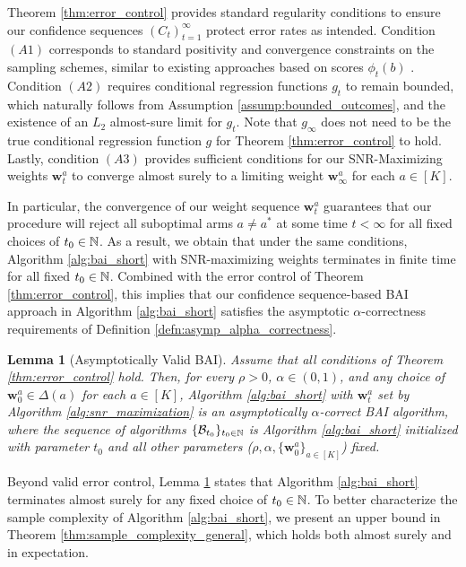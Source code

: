 \documentclass{article}
\newtheorem{lemma}{Lemma}
\begin{document}
Theorem \ref{thm:error_control} provides standard regularity conditions to ensure our confidence sequences $(C_t)_{t=1}^\infty$ protect error rates as intended. Condition $(A1)$ corresponds to standard positivity and convergence constraints on the sampling schemes, similar to existing approaches based on scores $\phi_t(b)$ \citep{cook2024semiparametricefficientinferenceadaptive, kato2025efficientadaptiveexperimentaldesign}. Condition $(A2)$ requires conditional regression functions $g_t$ to remain bounded, which naturally follows from Assumption \ref{assump:bounded_outcomes}, and the existence of an $L_2$ almost-sure limit for $g_t$. Note that $g_\infty$ does not need to be the true conditional regression function $g$ for Theorem \ref{thm:error_control} to hold. Lastly, condition $(A3)$ provides sufficient conditions for our SNR-Maximizing weights $\bm{w}_t^a$ to converge almost surely to a limiting weight $\bm{w}_\infty^a$ for each $a \in [K]$.

In particular, the convergence of our weight sequence $\bm{w}_t^a$ guarantees that our procedure will reject all suboptimal arms $a \neq a^*$ at some time $t < \infty$ for all fixed choices of $t_0 \in \mathbb{N}$. As a result, we obtain that under the same conditions, Algorithm \ref{alg:bai_short} with SNR-maximizing weights terminates in finite time for all fixed $t_0 \in \mathbb{N}$. Combined with the error control of Theorem \ref{thm:error_control}, this implies that our confidence sequence-based BAI approach in Algorithm \ref{alg:bai_short} satisfies the asymptotic $\alpha$-correctness requirements of Definition \ref{defn:asymp_alpha_correctness}.


\begin{lemma}[Asymptotically Valid BAI]\label{lem:asymp_valid_bai}
    Assume that all conditions of Theorem \ref{thm:error_control} hold. Then, for every $\rho >0$, $\alpha \in (0,1)$, and any choice of $\bm{w}_0^a \in \Delta(a)$ for each $a\in [K]$, Algorithm \ref{alg:bai_short} with $\bm{w}_t^a$ set by Algorithm \ref{alg:snr_maximization} is an asymptotically $\alpha$-correct BAI algorithm, where the sequence of algorithms $\{\mathcal{B}_{t_0}\}_{t_0 \in \mathbb{N}}$ is Algorithm \ref{alg:bai_short} initialized with parameter $t_0$ and all other parameters ($\rho, \alpha, \{\bm{w}_0^a\}_{a \in [K]}$) fixed. 
\end{lemma}

Beyond valid error control, Lemma \ref{lem:asymp_valid_bai} states that Algorithm \ref{alg:bai_short} terminates almost surely for any fixed choice of $t_0 \in \mathbb{N}$. To better characterize the sample complexity of Algorithm \ref{alg:bai_short}, we present an upper bound in Theorem \ref{thm:sample_complexity_general}, which holds both almost surely and in expectation. 
\end{document}
